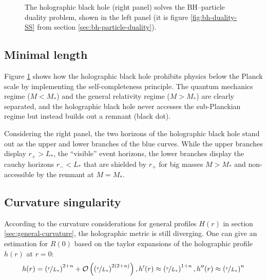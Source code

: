 \documentclass[12pt,a4paper]{report}
\numberwithin{equation}{chapter}
\begin{document}
\begin{figure}
\begin{subfigure}{0.45\textwidth}
\end{subfigure}
\caption[Length scales for the holographic black hole in higher dimensions.]{The holographic black hole (right panel) solves the BH--particle duality problem, shown in the left panel (it is figure \ref{fig:bh-duality-SS} from section \ref{sec:bh-particle-duality}).}\label{fig:completeness-holoN}
%
\end{figure}

\subsection{Minimal length}
Figure \ref{fig:completeness-holoN} shows how the holographic black hole prohibits physics below the Planck scale by implementing the self-completeness principle. The quantum mechanics regime ($M<M_*$) and the general relativity regime ($M>M_*$) are clearly separated, and the holographic black hole never accesses the sub-Planckian regime but instead builds out a remnant (black dot).

Considering the right panel, the two horizons of the holographic black hole stand out as the upper and lower branches of the blue curves.  While the upper branches display $r_+ > L_*$, the ``visible'' event horizons, the lower branches display the cauchy horizons $r_- < L_*$ that are shielded by $r_+$ for big masses $M > M_*$ and non-accessible by the remnant at $M=M_*$.

\subsection{Curvature singularity}
According to the curvature considerations for general profiles $H(r)$ in section \ref{sec:general-curvature}, the holographic metric is still diverging.
%
One can give an estimation for $R(0)$ based on the taylor expansions of the holographic profile $h(r)$ at $r=0$:
\begin{equation}
h(r) = \left( \nicefrac r{L_*} \right)^{2+n} + {\cal O}\left( \left( \nicefrac r{L_*} \right)^{2 (2+n)}\right), h'(r) \approx \left( \nicefrac r{L_*} \right)^{1+n}, h''(r) \approx \left( \nicefrac r{L_*} \right)^n
\end{equation}
\end{document}

